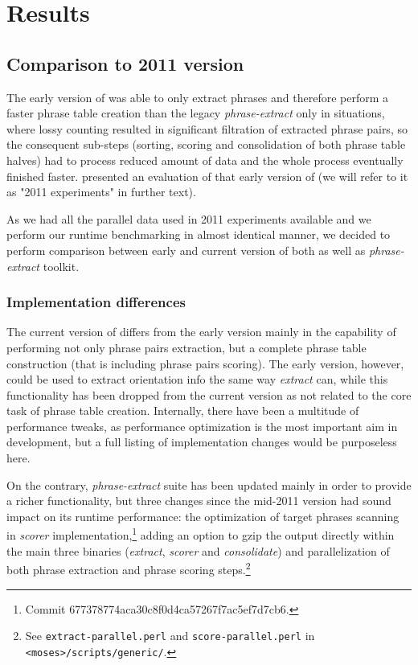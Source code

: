 \chapter{Results}
\label{chap:results}

\section{Comparison to 2011 version}

The early version of \eppex{} was able to only extract phrases and therefore
perform a faster phrase table creation than the legacy \emph{phrase-extract}
only in situations, where lossy counting resulted in significant filtration of
extracted phrase pairs, so the consequent sub-steps (sorting, scoring and
consolidation of both phrase table halves) had to process reduced amount of
data and the whole process eventually finished faster.
\citet{przywara:eppex} presented an evaluation of that early version of
\eppex{} (we will refer to it as "2011 experiments" in further text).

As we had all the parallel data used in 2011 experiments available and
we perform our runtime benchmarking in almost identical manner,
we decided to perform comparison between early and current version of both
\eppex{} as well as \emph{phrase-extract} toolkit.

\subsection{Implementation differences}

The current version of \eppex{} differs from the early version mainly in the
capability of performing not only phrase pairs extraction, but a complete
phrase table construction (that is including phrase pairs scoring).
The early version, however, could be used to extract orientation info
the same way \emph{extract} can, while this functionality has been dropped
from the current version as not related to the core task of phrase table creation.
Internally, there have been a multitude of performance tweaks,
as performance optimization is the most important aim in \eppex{} development,
but a full listing of implementation changes would be purposeless here.

On the contrary, \emph{phrase-extract} suite has been updated mainly in order to
provide a richer functionality, but three changes since the mid-2011 version
had sound impact on its runtime performance: the optimization of target phrases
scanning in \emph{scorer} implementation,\footnote{Commit 677378774aca30c8f0d4ca57267f7ac5ef7d7cb6.}
adding an option to gzip the output directly within the main three binaries
(\emph{extract}, \emph{scorer} and \emph{consolidate})
and parallelization of both phrase extraction and phrase scoring
steps.\footnote{See \texttt{extract-parallel.perl} and \texttt{score-parallel.perl}
in \texttt{<moses>/scripts/generic/}.}

